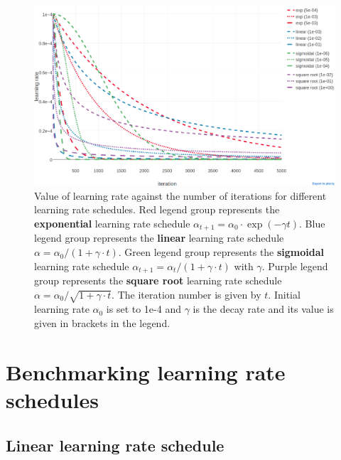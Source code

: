 \documentclass[11pt,a4paper,twoside]{book}
\theoremstyle{definition}
\theoremstyle{definition}
\theoremstyle{remark}
\begin{document}
\begin{figure}

{\centering \includegraphics[width=1\linewidth]{img/full_likelihood/appendix/learning_rate_schedules_alpha0_1e-4_notitle} 

}

\caption{Value of learning rate against the
number of iterations for different learning rate schedules. Red legend
group represents the \textbf{exponential} learning rate schedule
\(\alpha_{t+1} = \alpha_0 \cdot\exp(- \gamma t)\). Blue legend group
represents the \textbf{linear} learning rate schedule
\(\alpha = \alpha_0 / (1 + \gamma \cdot t)\). Green legend group
represents the \textbf{sigmoidal} learning rate schedule
\(\alpha_{t+1} = \alpha_{t} / (1 + \gamma \cdot t)\) with \(\gamma\).
Purple legend group represents the \textbf{square root} learning rate
schedule \(\alpha = \alpha_0 / \sqrt{1 + \gamma \cdot t}\). The
iteration number is given by \(t\). Initial learning rate \(\alpha_0\)
is set to 1e-4 and \(\gamma\) is the decay rate and its value is given
in brackets in the legend.}\label{fig:learning-rate-schedules}
\end{figure}

\section{Benchmarking learning rate
schedules}\label{benchmark-learning-rate-annealing-schedules}

\subsection{Linear learning rate
schedule}\label{linear-learning-rate-schedule}
\end{document}
